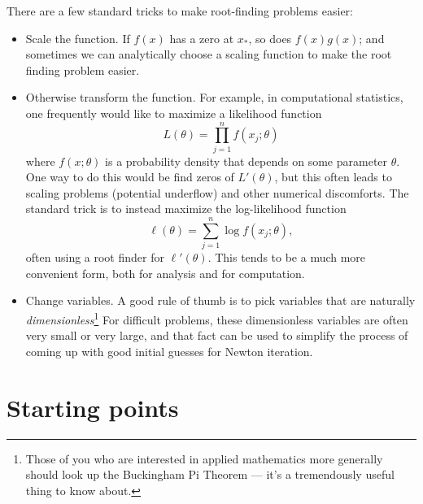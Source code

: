 \documentclass[12pt, leqno]{article} %
\begin{document}
There are a few standard tricks to make root-finding problems easier:
\begin{itemize}
\item
  Scale the function.  If $f(x)$ has a zero at $x_*$, so does $f(x)
  g(x)$; and sometimes we can analytically choose a scaling function
  to make the root finding problem easier.
\item
  Otherwise transform the function.  For example, in computational
  statistics, one frequently would like to maximize a likelihood function
  \[
    L(\theta) = \prod_{j=1}^n f(x_j; \theta)
  \]
  where $f(x; \theta)$ is a probability density that depends on some
  parameter $\theta$.  One way to do this would be find zeros of
  $L'(\theta)$, but this often leads to scaling problems (potential
  underflow) and other numerical discomforts.  The standard trick is
  to instead maximize the log-likelihood function
  \[
    \ell(\theta) = \sum_{j=1}^n \log f(x_j; \theta),
  \]
  often using a root finder for $\ell'(\theta)$.  This tends to be a
  much more convenient form, both for analysis and for computation.
\item
  Change variables.  A good rule of thumb is to pick variables that
  are naturally {\em dimensionless}\footnote{%
Those of you who are interested in applied mathematics more generally
should look up the Buckingham Pi Theorem --- it's a tremendously
useful thing to know about.
}
  For difficult problems, these dimensionless variables are often very
  small or very large, and that fact can be used to simplify the
  process of coming up with good initial guesses for Newton iteration.
\end{itemize}

\section*{Starting points}

\end{document}
